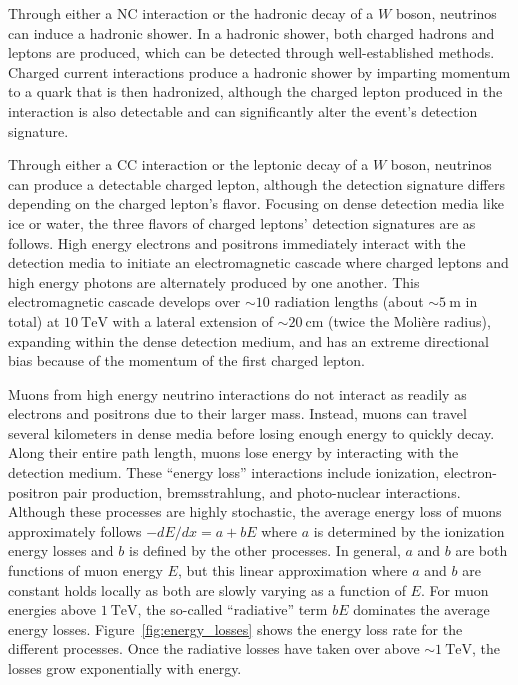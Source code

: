 Through either a NC interaction or the hadronic decay of a $W$ boson, neutrinos can induce a hadronic shower.
In a hadronic shower, both charged hadrons and leptons are produced, which can be detected through well-established methods.
Charged current interactions produce a hadronic shower by imparting momentum to a quark that is then hadronized, although the charged lepton produced in the interaction is also detectable and can significantly alter the event's detection signature.

Through either a CC interaction or the leptonic decay of a $W$ boson, neutrinos can produce a detectable charged lepton, although the detection signature differs depending on the charged lepton's flavor.
Focusing on dense detection media like ice or water, the three flavors of charged leptons' detection signatures are as follows.
High energy electrons and positrons immediately interact with the detection media to initiate an electromagnetic cascade where charged leptons and high energy photons are alternately produced by one another.
This electromagnetic cascade develops over $\sim10$ radiation lengths (about $\sim\SI{5}\m$ in total) at $\SI{10}\TeV$ with a lateral extension of $\sim\SI{20}\cm$ (twice the Molière radius), expanding within the dense detection medium, and has an extreme directional bias because of the momentum of the first charged lepton.

Muons from high energy neutrino interactions do not interact as readily as electrons and positrons due to their larger mass.
Instead, muons can travel several kilometers in dense media before losing enough energy to quickly decay.
Along their entire path length, muons lose energy by interacting with the detection medium.
These ``energy loss'' interactions include ionization, electron-positron pair production, bremsstrahlung, and photo-nuclear interactions.
Although these processes are highly stochastic, the average energy loss of muons approximately follows $-dE/dx=a+bE$ where $a$ is determined by the ionization energy losses and $b$ is defined by the other processes.
In general, $a$ and $b$ are both functions of muon energy $E$, but this linear approximation where $a$ and $b$ are constant holds locally as both are slowly varying as a function of $E$.
For muon energies above $\SI{1}\TeV$, the so-called ``radiative'' term $bE$ dominates the average energy losses.
Figure~\ref{fig:energy_losses} shows the energy loss rate for the different processes.
Once the radiative losses have taken over above $\sim\SI{1}\TeV$, the losses grow exponentially with energy.

